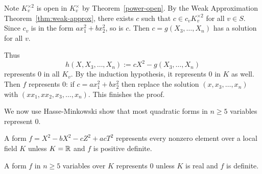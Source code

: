 Note $K_v^{\times2}$ is open in $K_v^{\times}$ by Theorem~\ref{power-open}. %
By the Weak Approximation Theorem~\ref{thm:weak-approx}, there exists $c$ such that $c\in c_vK_v^{\times 2}$ for all $v\in S$. Since $c_v$ is in the form $ax_1^2+bx_2^2$, so is $c$. Then $c=g(X_3,\ldots, X_n)$ has a solution for all $v$.

Thus
\[
h(X,X_3,\ldots, X_n):=cX^2-g(X_3,\ldots, X_n)
\]
represents 0 in all $K_v$. By the induction hypothesis, it represents 0 in $K$ as well. Then $f$ represents 0: if $c=ax_1^2+bx_2^2$ then replace the solution $(x,x_3,\ldots, x_n)$ with $(xx_1,xx_2,x_3,\ldots, x_n)$. This finishes the proof.

We now use Hasse-Minkowski show that most quadratic forms in $n\ge 5$ variables represent 0.
\begin{lem}
A form $f=X^2-bX^2-cZ^2+acT^2$ represents every nonzero element over a local field $K$ unless $K=\mathbb{R}$ and $f$ is positive definite.

A form $f$ in $n\ge 5$ variables over $K$ represents 0 unless $K$ is real and $f$ is definite.
\end{lem}
